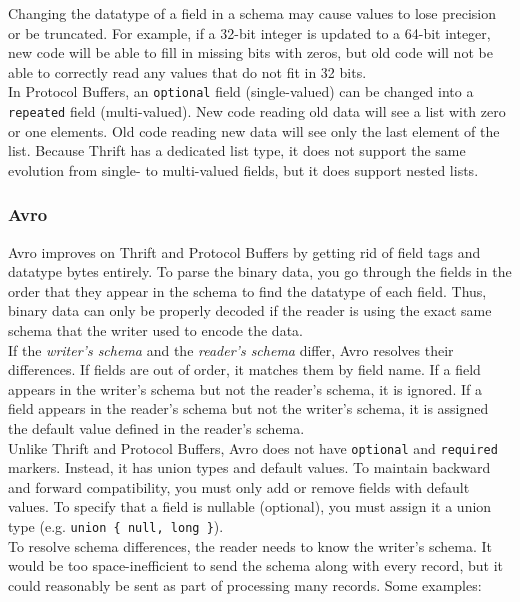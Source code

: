 \documentclass[12pt, titlepage]{article}
\begin{document}
Changing the datatype of a field in a schema may cause values to lose precision or be truncated. For example, if a 32-bit integer is updated to a 64-bit integer, new code will be able to fill in missing bits with zeros, but old code will not be able to correctly read any values that do not fit in 32 bits. \\

In Protocol Buffers, an \texttt{optional} field (single-valued) can be changed into a \texttt{repeated} field (multi-valued). New code reading old data will see a list with zero or one elements. Old code reading new data will see only the last element of the list. Because Thrift has a dedicated list type, it does not support the same evolution from single- to multi-valued fields, but it does support nested lists.

\subsubsection{Avro}

Avro improves on Thrift and Protocol Buffers by getting rid of field tags and datatype bytes entirely. To parse the binary data, you go through the fields in the order that they appear in the schema to find the datatype of each field. Thus, binary data can only be properly decoded if the reader is using the exact same schema that the writer used to encode the data. \\

If the \textit{writer's schema} and the \textit{reader's schema} differ, Avro resolves their differences. If fields are out of order, it matches them by field name. If a field appears in the writer's schema but not the reader's schema, it is ignored. If a field appears in the reader's schema but not the writer's schema, it is assigned the default value defined in the reader's schema. \\

Unlike Thrift and Protocol Buffers, Avro does not have \texttt{optional} and \texttt{required} markers. Instead, it has union types and default values. To maintain backward and forward compatibility, you must only add or remove fields with default values. To specify that a field is nullable (optional), you must assign it a union type (e.g. \texttt{union \{ null, long \}}). \\

To resolve schema differences, the reader needs to know the writer's schema. It would be too space-inefficient to send the schema along with every record, but it could reasonably be sent as part of processing many records. Some examples:
\end{document}
